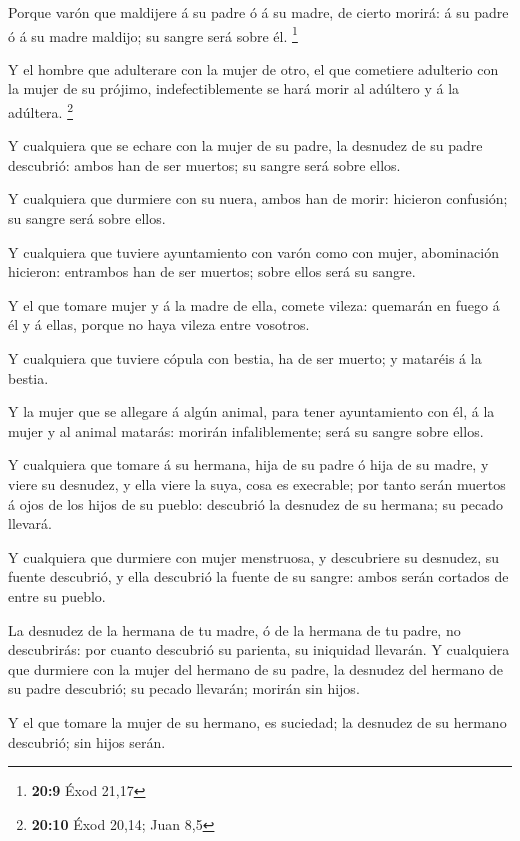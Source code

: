  Porque varón que maldijere á su padre ó á su madre, de
cierto morirá: á su padre ó á su madre maldijo; su sangre será sobre él.
\footnote{\textbf{20:9} Éxod 21,17}

 Y el hombre que adulterare con la mujer de otro, el que
cometiere adulterio con la mujer de su prójimo, indefectiblemente se
hará morir al adúltero y á la adúltera. \footnote{\textbf{20:10} Éxod
  20,14; Juan 8,5}

 Y cualquiera que se echare con la mujer de su padre, la
desnudez de su padre descubrió: ambos han de ser muertos; su sangre será
sobre ellos.

 Y cualquiera que durmiere con su nuera, ambos han de
morir: hicieron confusión; su sangre será sobre ellos.

 Y cualquiera que tuviere ayuntamiento con varón como con
mujer, abominación hicieron: entrambos han de ser muertos; sobre ellos
será su sangre.

 Y el que tomare mujer y á la madre de ella, comete vileza:
quemarán en fuego á él y á ellas, porque no haya vileza entre vosotros.

 Y cualquiera que tuviere cópula con bestia, ha de ser
muerto; y mataréis á la bestia.

 Y la mujer que se allegare á algún animal, para tener
ayuntamiento con él, á la mujer y al animal matarás: morirán
infaliblemente; será su sangre sobre ellos.

 Y cualquiera que tomare á su hermana, hija de su padre ó
hija de su madre, y viere su desnudez, y ella viere la suya, cosa es
execrable; por tanto serán muertos á ojos de los hijos de su pueblo:
descubrió la desnudez de su hermana; su pecado llevará.

 Y cualquiera que durmiere con mujer menstruosa, y
descubriere su desnudez, su fuente descubrió, y ella descubrió la fuente
de su sangre: ambos serán cortados de entre su pueblo.

 La desnudez de la hermana de tu madre, ó de la hermana de
tu padre, no descubrirás: por cuanto descubrió su parienta, su iniquidad
llevarán.  Y cualquiera que durmiere con la mujer del
hermano de su padre, la desnudez del hermano de su padre descubrió; su
pecado llevarán; morirán sin hijos.

 Y el que tomare la mujer de su hermano, es suciedad; la
desnudez de su hermano descubrió; sin hijos serán.


